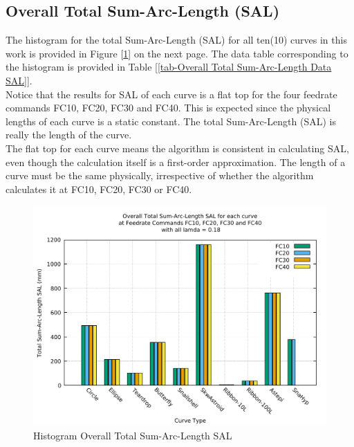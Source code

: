 \clearpage
\pagebreak

\subsection{Overall Total Sum-Arc-Length (SAL)}

The histogram for the total Sum-Arc-Length (SAL) for all ten(10) curves in this work is provided in Figure [\ref{img-Histogram Overall Total Sum-Arc-Length SAL}] on the next page. The data table corresponding to the histogram is provided in Table [\ref{tab-Overall Total Sum-Arc-Length Data SAL}]. \\

Notice that the results for SAL of each curve is a flat top for the four feedrate commands FC10, FC20, FC30 and FC40. This is expected since the physical lengths of each curve is a static constant. The total Sum-Arc-Length (SAL) is really the length of the curve. \\

The flat top for each curve means the algorithm is consistent in calculating SAL, even though the calculation itself is a first-order approximation. The length of a curve must be the same physically, irrespective of whether the algorithm calculates it at FC10, FC20, FC30 or FC40.  \\ 



\clearpage
\pagebreak
\begin{landscape}

\begin{figure}
\centering
\caption  {Histogram Overall Total Sum-Arc-Length SAL}
\label{img-Histogram Overall Total Sum-Arc-Length SAL}
\includegraphics[width=1.30\textwidth]{Chap4/Overall/Histogram/SAL-img-Histo-Overall-Total-Sum-Arc-Length.pdf} 
\end{figure}

\end{landscape}

